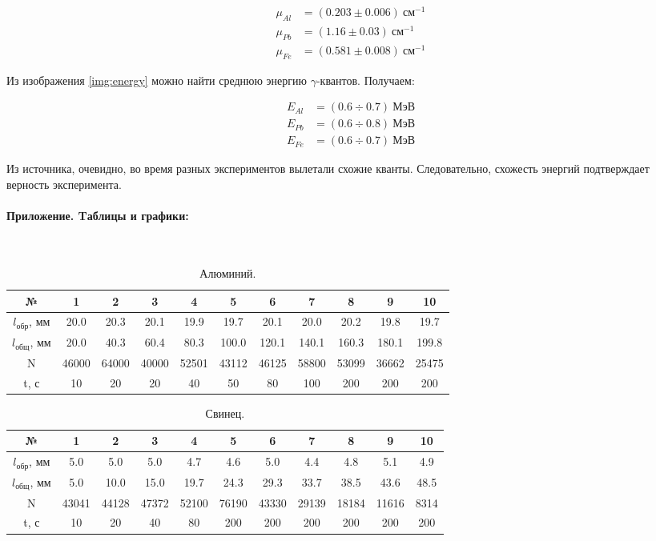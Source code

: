 \documentclass[a4paper, 12pt]{article}
\newcommand{\parag}[1]{\paragraph*{#1:}}
\begin{document}
\begin{align*}
    \mu_{Al} &= (0.203 \pm 0.006) ~ см^{-1} \\
    \mu_{Pb} &= (1.16  \pm 0.03)  ~ см^{-1} \\
    \mu_{Fe} &= (0.581 \pm 0.008) ~ см^{-1}
\end{align*}

Из изображения \ref{img:energy} можно найти среднюю энергию $\gamma$-квантов. Получаем:

\begin{align*}
    E_{Al} &= (0.6 \div 0.7) ~ МэВ \\
    E_{Pb} &= (0.6 \div 0.8) ~ МэВ \\
    E_{Fe} &= (0.6 \div 0.7) ~ МэВ
\end{align*}

Из источника, очевидно, во время разных экспериментов вылетали схожие кванты. Следовательно, схожесть энергий подтверждает верность эксперимента.

\parag {Приложение. Tаблицы и графики} ~\\

\begin{table}[!h]
    \centering
    \begin{tabular}{|c|c|c|c|c|c|c|c|c|c|c|}
        \hline
        № & 1 & 2 & 3 & 4 & 5 & 6 & 7 & 8 & 9 & 10\\ \hline
        $l_{обр}$, мм & 20.0 & 20.3 & 20.1 & 19.9 & 19.7 & 20.1 & 20.0 & 20.2 & 19.8 & 19.7\\ \hline
        $l_{общ}$, мм & 20.0 & 40.3 & 60.4 & 80.3 & 100.0 & 120.1 & 140.1 & 160.3 & 180.1 & 199.8\\ \hline
        N & 46000 & 64000 & 40000 & 52501 & 43112 & 46125 & 58800 & 53099 & 36662 & 25475\\ \hline
        t, с & 10 & 20 & 20 & 40 & 50 & 80 & 100 & 200 & 200 & 200
        \\ \hline
    \end{tabular}
    \caption {Алюминий.}
    \label{tab:1}
\end{table}

\begin{table}[!h]
    \centering
    \begin{tabular}{|c|c|c|c|c|c|c|c|c|c|c|}
        \hline
        № & 1 & 2 & 3 & 4 & 5 & 6 & 7 & 8 & 9 & 10\\ \hline
        $l_{обр}$, мм & 5.0 & 5.0 & 5.0 & 4.7 & 4.6 & 5.0 & 4.4 & 4.8 & 5.1 & 4.9\\ \hline
        $l_{общ}$, мм & 5.0 & 10.0 & 15.0 & 19.7 & 24.3 & 29.3 & 33.7 & 38.5 & 43.6 & 48.5\\ \hline
        N & 43041 & 44128 & 47372 & 52100 & 76190 & 43330 & 29139 & 18184 & 11616 & 8314\\ \hline
        t, с & 10 & 20 & 40 & 80 & 200 & 200 & 200 & 200 & 200 & 200
        \\ \hline
    \end{tabular}
    \caption {Свинец.}
    \label{tab:2}
\end{table}
\end{document}
